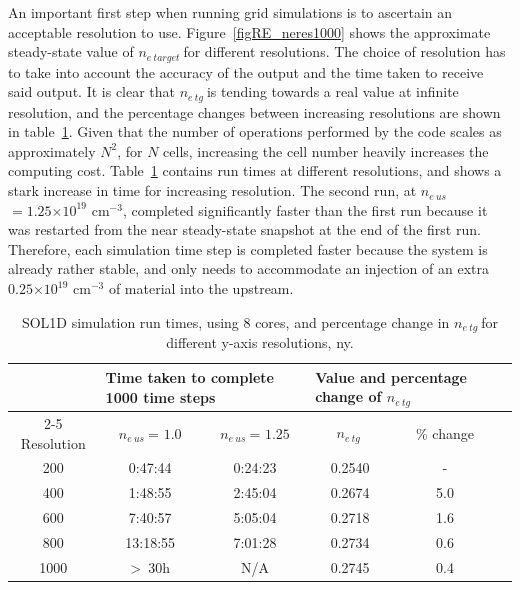 \documentclass[12pt]{article}  %
\providecommand{\e}[1]{\ensuremath{\times 10^{#1}}} %
\providecommand{\neus}{$n_{e~us}~$} %
\providecommand{\netarget}{$n_{e~target}~$} %
\providecommand{\netg}{$n_{e~tg}~$} %
\begin{document}
An important first step when running grid simulations is to ascertain an acceptable resolution to use. Figure~\ref{figRE_neres1000} shows the approximate steady-state value of \netarget for different resolutions. The choice of resolution has to take into account the accuracy of the output and the time taken to receive said output. It is clear that \netg is tending towards a real value at infinite resolution, and the percentage changes between increasing resolutions are shown in table~\ref{tabsol1dres}. Given that the number of operations performed by the code scales as approximately $N^2$, for $N$ cells, increasing the cell number heavily increases the computing cost. Table~\ref{tabsol1dres} contains run times at different resolutions, and shows a stark increase in time for increasing resolution. The second run, at \neus $= 1.25\e{19}$ cm$^{-3}$, completed significantly faster than the first run because it was restarted from the near steady-state snapshot at the end of the first run. Therefore, each simulation time step is completed faster because the system is already rather stable, and only needs to accommodate an injection of an extra $0.25\e{19}$ cm$^{-3}$ of material into the upstream.

\begin{table}[]
	\centering
	\caption{SOL1D simulation run times, using 8 cores, and percentage change in \netg for different y-axis resolutions, ny.}
	\label{tabsol1dres}
	\begin{tabular}{c|c|c|c|c|c}
		\multicolumn{1}{l|}{\multirow{2}{*}{}}   & \multicolumn{2}{l|}{Time taken to complete 1000 time steps}  & \multicolumn{2}{l|}{Value and percentage change of \netg} \\ \cline{2-5} 
		Resolution          & \neus = $1.0$ & \neus = $1.25$  & \netg & \% change  \\ \hline
		200                 &      0:47:44    \qquad   &    0:24:23        &  0.2540  &   -    \\
		400                 &      1:48:55    \qquad   &    2:45:04        &  0.2674  &  5.0   \\
		600                 &      7:40:57    \qquad   &    5:05:04        &  0.2718  &  1.6   \\
		800                 &     13:18:55    \qquad   &    7:01:28        &  0.2734  &  0.6   \\
	   1000                 &  \textgreater~30h \qquad &       N/A         &  0.2745  &  0.4
	\end{tabular}
\end{table}
\end{document}
